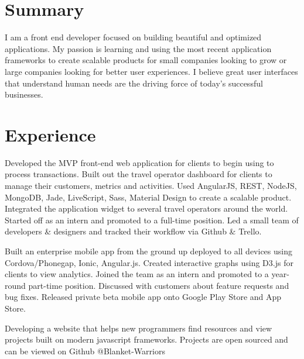 \documentclass[]{deedy-resume-openfont}
\begin{document}
\begin{minipage}[t]{0.58\textwidth} 


\section{Summary}
I am a front end developer focused on building beautiful and optimized applications. My passion is learning and using the most recent application frameworks to create scalable products for small companies looking to grow or large companies looking for better user experiences. I believe great user interfaces that understand human needs are the driving force of today's successful businesses.
\sectionsep


\section{Experience}
\descriptsep
Developed the MVP front-end web application for clients to begin using to process transactions.
Built out the travel operator dashboard for clients to manage their customers, metrics and activities.
Used AngularJS, REST, NodeJS, MongoDB, Jade, LiveScript, Sass, Material Design to create a scalable product. Integrated the application widget to several travel operators around the world. Started off as an intern and promoted to a full-time position. Led a small team of developers \& designers and tracked their workflow via Github \& Trello.
\sectionsep
\sectionsepextra

\descriptsep
Built an enterprise mobile app from the ground up deployed to all devices using Cordova/Phonegap, Ionic, Angular.js. Created interactive graphs using D3.js for clients to view analytics. Joined the team as an intern and promoted to a year-round part-time position. Discussed with customers about feature requests and bug fixes. Released private beta mobile app onto Google Play Store and App Store.
\sectionsep
\sectionsepextra

\descriptsep
Developing a website that helps new programmers find resources and view projects built on modern javascript frameworks. Projects are open sourced and can be viewed on Github @Blanket-Warriors\sectionsep
\sectionsepextra


\end{minipage}
\end{document}
